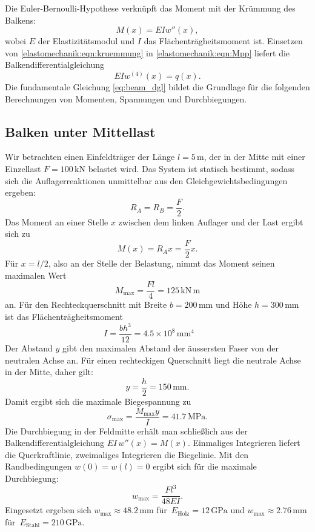 Die Euler-Bernoulli-Hypothese verknüpft das Moment mit der 
Krümmung des Balkens:
\begin{equation*}
  M(x) = EIw''(x),
\label{elastomechanik:eqn:kruemmung}
\end{equation*}
wobei \(E\) der Elastizitätsmodul und \(I\) das Flächenträgheitsmoment ist. 
Einsetzen
von
\eqref{elastomechanik:eqn:kruemmung}
in
\eqref{elastomechanik:eqn:Mpp}
liefert die Balkendifferentialgleichung
\begin{equation*}
  EIw^{(4)}(x) = q(x).
  \label{eq:beam_dgl}
\end{equation*}
Die fundamentale Gleichung \eqref{eq:beam_dgl}
bildet die Grundlage für die folgenden 
Berechnungen von Momenten, Spannungen und Durchbiegungen.


\subsection{Balken unter Mittellast}
Wir betrachten einen Einfeldträger der Länge \(l = 5\,\mathrm{m}\), der in der Mitte mit einer Einzellast \(F = 100\,\mathrm{kN}\) belastet wird. 
Das System ist statisch bestimmt, sodass sich die Auflagerreaktionen unmittelbar aus den Gleichgewichtsbedingungen ergeben:
\[
  R_A = R_B = \frac{F}{2}.
\]
Das Moment an einer Stelle \(x\) zwischen dem linken Auflager und der Last ergibt sich zu
\[
  M(x) = R_A   x = \frac{F}{2} x.
\]
Für \(x=l/2\), also an der Stelle der Belastung, nimmt das Moment seinen 
maximalen Wert
\begin{equation*}
  M_{\max} = \frac{F l}{4} = 125\,\mathrm{kN\,m}
  \label{eq:Mmax}
\end{equation*}
an. Für den Rechteckquerschnitt mit Breite \(b=200\,\mathrm{mm}\) 
und Höhe \(h=300\,\mathrm{mm}\) ist das Flächenträgheitsmoment
\[
  I = \frac{b h^3}{12} = 4.5 \times 10^8\,\mathrm{mm^4}
  \qquad 
\]
Der Abstand \(y\) gibt den maximalen Abstand der äussersten Faser von der neutralen Achse an. 
Für einen rechteckigen Querschnitt liegt die neutrale Achse 
in der Mitte, daher gilt:
\[
  y = \frac{h}{2}= 150\,\mathrm{mm}.
\]
Damit ergibt sich die maximale Biegespannung zu
\begin{equation*}
  \sigma_{\max} = \frac{M_{\max} y}{I} = 41.7\,\mathrm{MPa}.
  \label{eq:sigma_max}
\end{equation*}
Die Durchbiegung in der Feldmitte erhält man schließlich aus der Balkendifferentialgleichung \(EI\,w''(x)=M(x)\). 
Einmaliges Integrieren liefert die Querkraftlinie, zweimaliges Integrieren die Biegelinie. 
Mit den Randbedingungen \(w(0)=w(l)=0\) ergibt sich für die 
maximale Durchbiegung:
\begin{equation*}
  w_{\max} = \frac{F l^3}{48 E I}.
  \label{eq:wmax}
\end{equation*}
Eingesetzt ergeben sich 
\(w_{\max} \approx 48.2\,\mathrm{mm}\) für 
\(\,E_{\text{Holz}}=12\,\mathrm{GPa}\)
und
\(w_{\max} \approx 2.76\,\mathrm{mm}\) für 
\(\,E_{\text{Stahl}}=210\,\mathrm{GPa}\).

